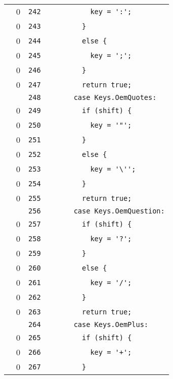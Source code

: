 \documentclass[a4paper,10pt]{article}
\begin{document}
\begin{longtable}[l]{lrrl}
\cellcolor{red} & 0 & \verb~242~ & \verb~          key = ':';~\\
\cellcolor{red} & 0 & \verb~243~ & \verb~        }~\\
\cellcolor{red} & 0 & \verb~244~ & \verb~        else {~\\
\cellcolor{red} & 0 & \verb~245~ & \verb~          key = ';';~\\
\cellcolor{red} & 0 & \verb~246~ & \verb~        }~\\
\cellcolor{red} & 0 & \verb~247~ & \verb~        return true;~\\
\cellcolor{gray} &  & \verb~248~ & \verb~      case Keys.OemQuotes:~\\
\cellcolor{red} & 0 & \verb~249~ & \verb~        if (shift) {~\\
\cellcolor{red} & 0 & \verb~250~ & \verb~          key = '"';~\\
\cellcolor{red} & 0 & \verb~251~ & \verb~        }~\\
\cellcolor{red} & 0 & \verb~252~ & \verb~        else {~\\
\cellcolor{red} & 0 & \verb~253~ & \verb~          key = '\'';~\\
\cellcolor{red} & 0 & \verb~254~ & \verb~        }~\\
\cellcolor{red} & 0 & \verb~255~ & \verb~        return true;~\\
\cellcolor{gray} &  & \verb~256~ & \verb~      case Keys.OemQuestion:~\\
\cellcolor{red} & 0 & \verb~257~ & \verb~        if (shift) {~\\
\cellcolor{red} & 0 & \verb~258~ & \verb~          key = '?';~\\
\cellcolor{red} & 0 & \verb~259~ & \verb~        }~\\
\cellcolor{red} & 0 & \verb~260~ & \verb~        else {~\\
\cellcolor{red} & 0 & \verb~261~ & \verb~          key = '/';~\\
\cellcolor{red} & 0 & \verb~262~ & \verb~        }~\\
\cellcolor{red} & 0 & \verb~263~ & \verb~        return true;~\\
\cellcolor{gray} &  & \verb~264~ & \verb~      case Keys.OemPlus:~\\
\cellcolor{red} & 0 & \verb~265~ & \verb~        if (shift) {~\\
\cellcolor{red} & 0 & \verb~266~ & \verb~          key = '+';~\\
\cellcolor{red} & 0 & \verb~267~ & \verb~        }~\\

\end{longtable}
\end{document}
